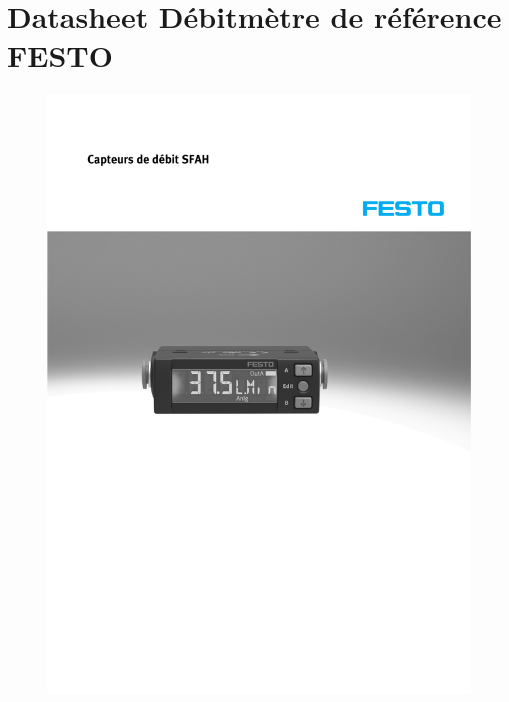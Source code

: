 \documentclass[
    iai & comatec, %
    mi, %
]{heig-tb}
\begin{document}
\section{Datasheet Débitmètre de référence FESTO}
\begin{figure}[H]
    \hspace{-1cm}
    \includegraphics[scale = 0.8, page = 1]{assets/pdf/Festo_DebitmetreSFAH.PDF}
\end{figure}

\end{document}
